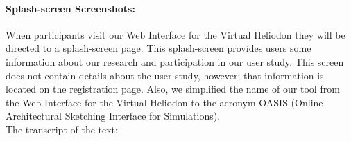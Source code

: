 \documentclass[12pt]{article}
\begin{document}

\newpage
\paragraph{Splash-screen Screenshots:}
When participants visit our Web Interface for the Virtual Heliodon they will be directed to a splash-screen page. 
This splash-screen provides users some information about our research and participation in our user study. This screen does not contain details about the user study, however; that information is located on the registration page. Also, we simplified the name of our tool from the Web Interface for the Virtual Heliodon to the acronym OASIS (Online Architectural Sketching Interface for Simulations).\\

\noindent The transcript of the text:\\
\end{document}
